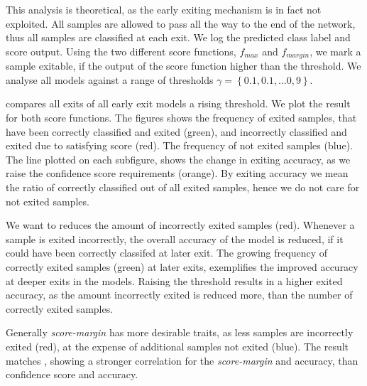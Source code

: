 This analysis is theoretical, as the early exiting mechanism is in fact not exploited. All samples are allowed to pass all the way to the end of the network, thus all samples are classified at each exit. We log the predicted class label and score output. Using the two different score functions, $ f_{max} $ and $ f_{margin} $, we mark a sample exitable, if the output of the score function higher than the threshold. We analyse all models against a range of thresholds $ \gamma = \left\{0.1, 0.1, \dots 0,9\right\} $.

 compares all exits of all early exit models a rising threshold. We plot the result for both score functions.
The figures shows the frequency of exited samples, that have been correctly classified and exited ({\color{sns-green}green}), and incorrectly classified and exited due to satisfying score ({\color{sns-red}red}). The frequency of not exited samples ({\color{sns-blue}blue}). The line plotted on each subfigure, shows the change in exiting accuracy, as we raise the confidence score requirements ({\color{sns-orange}orange}). By exiting accuracy we mean the ratio of correctly classified out of all exited samples, hence we do not care for not exited samples.

We want to reduces the amount of incorrectly exited samples ({\color{sns-red}red}). Whenever a sample is exited incorrectly, the overall accuracy of the model is reduced, if it could have been correctly classifed at later exit. The growing frequency of correctly exited samples ({\color{sns-green}green}) at later exits, exemplifies the improved accuracy at deeper exits in the models. Raising the threshold results in a higher exited accuracy, as the amount incorrectly exited is reduced more, than the number of correctly exited samples. 

Generally \emph{score-margin} has more desirable traits, as less samples are incorrectly exited ({\color{sns-red}red}), at the expense of additional samples not exited ({\color{sns-blue}blue}). The result matches \cite{park_big/little_2015,tann_flexible_2018}, showing a stronger correlation for the \emph{score-margin} and accuracy, than confidence score and accuracy. 

